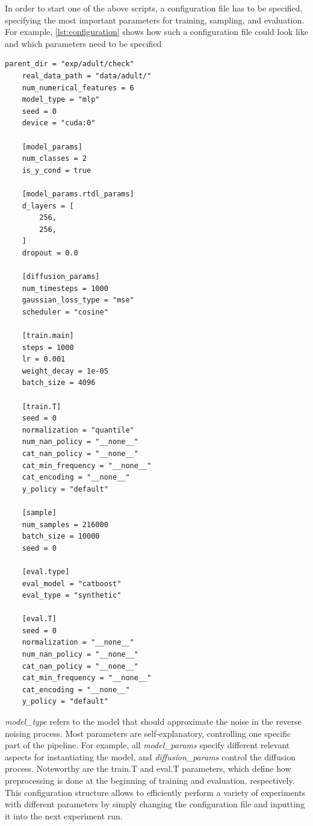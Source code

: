 In order to start one of the above scripts, a configuration file has to be specified, specifying the most important parameters for training, sampling, and evaluation.
For example, \autoref{lst:configuration} shows how such a configuration file could look like and which parameters need to be specified

\begin{lstlisting}[label={lst:configuration}, caption={Example Configuration File}]
    parent_dir = "exp/adult/check"
    real_data_path = "data/adult/"
    num_numerical_features = 6
    model_type = "mlp"
    seed = 0
    device = "cuda:0"

    [model_params]
    num_classes = 2
    is_y_cond = true

    [model_params.rtdl_params]
    d_layers = [
        256,
        256,
    ]
    dropout = 0.0

    [diffusion_params]
    num_timesteps = 1000
    gaussian_loss_type = "mse"
    scheduler = "cosine"

    [train.main]
    steps = 1000
    lr = 0.001
    weight_decay = 1e-05
    batch_size = 4096

    [train.T]
    seed = 0
    normalization = "quantile"
    num_nan_policy = "__none__"
    cat_nan_policy = "__none__"
    cat_min_frequency = "__none__"
    cat_encoding = "__none__"
    y_policy = "default"

    [sample]
    num_samples = 216000
    batch_size = 10000
    seed = 0

    [eval.type]
    eval_model = "catboost"
    eval_type = "synthetic"

    [eval.T]
    seed = 0
    normalization = "__none__"
    num_nan_policy = "__none__"
    cat_nan_policy = "__none__"
    cat_min_frequency = "__none__"
    cat_encoding = "__none__"
    y_policy = "default"
\end{lstlisting}    


\textit{model\_type} refers to the model that should approximate the noise in the reverse noising process.
Most parameters are self-explanatory, controlling one specific part of the pipeline.
For example, all \textit{model\_params} specify different relevant aspects for instantiating the model, and \textit{diffusion\_params} control the diffusion process.
Noteworthy are the train.T and eval.T parameters, which define how preprocessing is done at the beginning of training and evaluation, respectively.
This configuration structure allows to efficiently perform a variety of experiments with different parameters by simply changing the configuration file and inputting it into the next experiment run.

